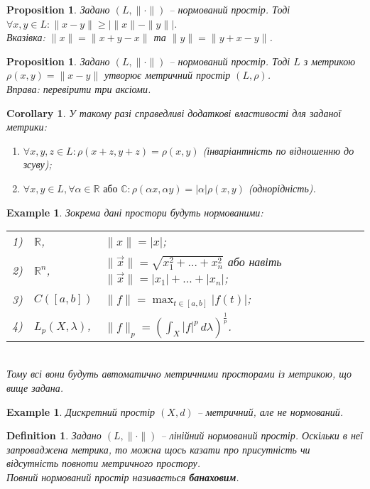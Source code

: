 \documentclass[a4paper, 10pt]{article}
\theoremstyle{theoremdd}
\theoremstyle{theoremdd}
\newtheorem{definition}[theorem]{Definition}
\theoremstyle{theoremdd}
\theoremstyle{theoremdd}
\newtheorem{example}[theorem]{Example}
\theoremstyle{theoremdd}
\newtheorem{proposition}[theorem]{Proposition}
\theoremstyle{theoremdd}
\theoremstyle{theoremdd}
\theoremstyle{theoremdd}
\newtheorem{corollary}[theorem]{Corollary}
\begin{document}
\begin{proposition}
Задано $(L, \| \cdot \|)$ -- нормований простір. Тоді $\forall x,y \in L: \|x-y\| \geq \left| \|x\| - \|y\| \right|$.\\
\textit{Вказівка: $\|x\| = \|x + y - x\|$ та $\|y\| = \|y + x -y \|$.}
\end{proposition}

\begin{proposition}
Задано $(L, \| \cdot \|)$ -- нормований простір. Тоді $L$ з метрикою $\rho(x,y) = \|x-y\|$ утворює метричний простір $(L,\rho)$.\\
\textit{Вправа: перевірити три аксіоми.}
\end{proposition}

\begin{corollary}
У такому разі справедливі додаткові властивості для заданої метрики:
\begin{enumerate}[nosep,wide=0pt,label={\arabic*)}]
\item $\forall x,y,z \in L: \rho(x+z,y+z) = \rho(x,y)$ (інваріантність по відношенню до зсуву);
\item $\forall x,y \in L, \forall \alpha \in \mathbb{R} \text{ або } \mathbb{C}: \rho(\alpha x, \alpha y) = |\alpha| \rho(x,y)$ (однорідність).
\end{enumerate}
\end{corollary}

\begin{example}
Зокрема дані простори будуть нормованими:\\
\begin{tabular}{rll}
1) & $\mathbb{R}$, & $\| x\| = |x|$;\\
2) & $\mathbb{R}^n$, & $\| \vec{x} \| = \sqrt{x_1^2 + \dots + x_n^2}$ або навіть $\| \vec{x} \| = |x_1| + \dots + |x_n|$;\\
3) & $C([a,b])$ & $\displaystyle \| f\| = \max_{t \in [a,b]} |f(t)|$;\\
4) & $L_p(X,\lambda)$, & $\|f\|_p = \displaystyle\left(\int_X |f|^p\,d\lambda\right)^{\frac{1}{p}}$.
\end{tabular}\\
Тому всі вони будуть автоматично метричними просторами із метрикою, що вище задана.
\end{example}

\begin{example}
Дискретний простір $(X,d)$ -- метричний, але не нормований.
\end{example}

\begin{definition}
Задано $(L, \|\cdot\|)$ -- лінійний нормований простір. Оскільки в неї запроваджена метрика, то можна щось казати про присутність чи відсутність повноти метричного простору.\\
Повний нормований простір називається \textbf{банаховим}.
\end{definition}
\end{document}
